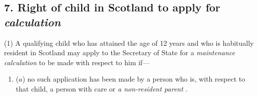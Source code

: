 \documentclass[12pt,a4paper]{article}
\begin{document}
%
%
%
%
%
%

\subsection{7. Right of child in Scotland to apply for 
\emph{calculation}  %
}

(1) A qualifying child who has attained the age of 12 years and who is habitually resident in Scotland may apply to the 
Secretary of State  %
for a 
\emph{maintenance calculation}  %
to be made with respect to him if—
\begin{enumerate}\item[]
($a$) no such application has been made by a person who is, with respect to that child, a person with care or 
\emph{a non-resident parent}%
%
%
.
\end{enumerate}
\end{document}

